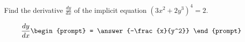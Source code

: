 \documentclass{ximera}
\author{Gregory Hartman \and Matthew Carr}
\begin{document}
\begin{exercise}




Find the derivative $\frac{dy}{dx}$ of the implicit equation $(3x^2+2y^3)^4=2$.

\[
\frac{dy}{dx}
\begin{prompt}
= \answer{-\frac{x}{y^2}}
\end{prompt}
\]


\end{exercise}
\end{document}

